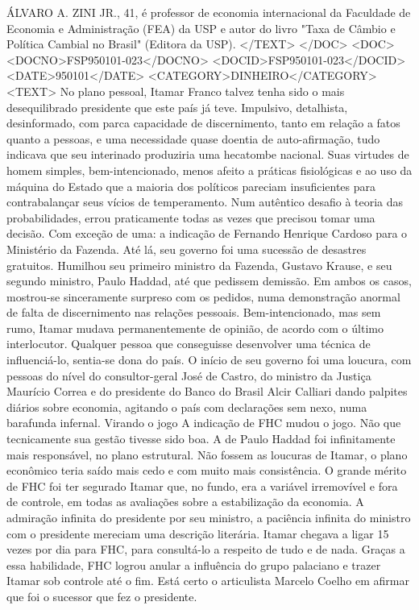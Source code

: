 ÁLVARO A. ZINI JR., 41, é professor de economia internacional da Faculdade de Economia e Administração (FEA) da USP e autor do livro "Taxa de Câmbio e Política Cambial no Brasil" (Editora da USP).
</TEXT>
</DOC>
<DOC>
<DOCNO>FSP950101-023</DOCNO>
<DOCID>FSP950101-023</DOCID>
<DATE>950101</DATE>
<CATEGORY>DINHEIRO</CATEGORY>
<TEXT>
No plano pessoal, Itamar Franco talvez tenha sido o mais desequilibrado presidente que este país já teve. Impulsivo, detalhista, desinformado, com parca capacidade de discernimento, tanto em relação a fatos quanto a pessoas, e uma necessidade quase doentia de auto-afirmação, tudo indicava que seu interinado produziria uma hecatombe nacional.
Suas virtudes de homem simples, bem-intencionado, menos afeito a práticas fisiológicas e ao uso da máquina do Estado que a maioria dos políticos pareciam insuficientes para contrabalançar seus vícios de temperamento.
Num autêntico desafio à teoria das probabilidades, errou praticamente todas as vezes que precisou tomar uma decisão. Com exceção de uma: a indicação de Fernando Henrique Cardoso para o Ministério da Fazenda.
Até lá, seu governo foi uma sucessão de desastres gratuitos. Humilhou seu primeiro ministro da Fazenda, Gustavo Krause, e seu segundo ministro, Paulo Haddad, até que pedissem demissão. Em ambos os casos, mostrou-se sinceramente surpreso com os pedidos, numa demonstração anormal de falta de discernimento nas relações pessoais.
Bem-intencionado, mas sem rumo, Itamar mudava permanentemente de opinião, de acordo com o último interlocutor. Qualquer pessoa que conseguisse desenvolver uma técnica de influenciá-lo, sentia-se dona do país.
O início de seu governo foi uma loucura, com pessoas do nível do consultor-geral José de Castro, do ministro da Justiça Maurício Correa e do presidente do Banco do Brasil Alcir Calliari dando palpites diários sobre economia, agitando o país com declarações sem nexo, numa barafunda infernal.
Virando o jogo 
A indicação de FHC mudou o jogo. Não que tecnicamente sua gestão tivesse sido boa. A de Paulo Haddad foi infinitamente mais responsável, no plano estrutural. Não fossem as loucuras de Itamar, o plano econômico teria saído mais cedo e com muito mais consistência.
O grande mérito de FHC foi ter segurado Itamar que, no fundo, era a variável irremovível e fora de controle, em todas as avaliações sobre a estabilização da economia. A admiração infinita do presidente por seu ministro, a paciência infinita do ministro com o presidente mereciam uma descrição literária. Itamar chegava a ligar 15 vezes por dia para FHC, para consultá-lo a respeito de tudo e de nada.
Graças a essa habilidade, FHC logrou anular a influência do grupo palaciano e trazer Itamar sob controle até o fim. Está certo o articulista Marcelo Coelho em afirmar que foi o sucessor que fez o presidente.

